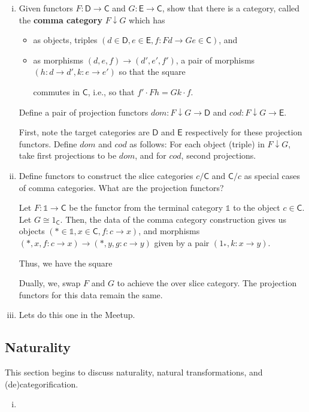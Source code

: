 \documentclass[10pt, oneside]{article}   	%
\newcommand{\cat}[1]{\bm{ \mathsf{#1} }}
\newcommand{\cc}{\cat{C}}
\newcommand{\dd}{\cat{D}}
\newcommand{\ee}{\cat{E}}
\newcommand{\one}{\mathbb{1}}
\begin{document}
\begin{enumerate}[(i)]
\item Given functors $ F : \dd \to \cc$ and $G : \ee \to \cc$, show that there is a category, called the \textbf{comma category} $F \downarrow G$ which has 

\begin{itemize}
\item as objects, triples $(d \in \dd, e \in \ee, f : Fd \to Ge \in \cc)$, and 
\item as morphisms $(d, e, f) \to (d', e', f')$, a pair of morphisms $(h : d \to d', k: e \to e')$ so that the square 

\begin{center}
\end{center}

commutes in $\cc$, i.e., so that $f' \cdot Fh = Gk \cdot f$. 
\end{itemize}

Define a pair of projection functors $dom : F \downarrow G \to \dd$ and $cod : F \downarrow G \to \ee$. 


First, note the target categories are $\dd$ and $\ee$ respectively for these projection functors. Define $dom$ and $cod$ as follows: For each object (triple) in $F \downarrow G$, take first projections to be $dom$, and for $cod$, second projections. 

\item Define functors to construct the slice categories $c / \cc$ and $\cc / c$ as special cases of comma categories. What are the projection functors?

Let $F : \one \to \cc$ be the functor from the terminal category $\one$ to the object $c \in \cc$. Let $G \cong 1_{\cc}$. Then, the data of the comma category construction gives us objects $(* \in \one, x \in \cc, f : c \to x)$, and morphisms $(*, x, f: c \to x) \to (*, y, g: c \to y)$ given by a pair $(1_*, k: x \to y)$. 

\newpage

Thus, we have the square

\begin{center}
\end{center}

Dually, we, swap $F$ and $G$ to achieve the over slice category. The projection functors for this data  remain the same. 

\item Lets do this one in the Meetup.
\end{enumerate}

\subsection{Naturality}

This section begins to discuss naturality, natural transformations, and (de)categorification. 

\begin{enumerate}[(i)]
\item 
\end{enumerate}
\end{document}
